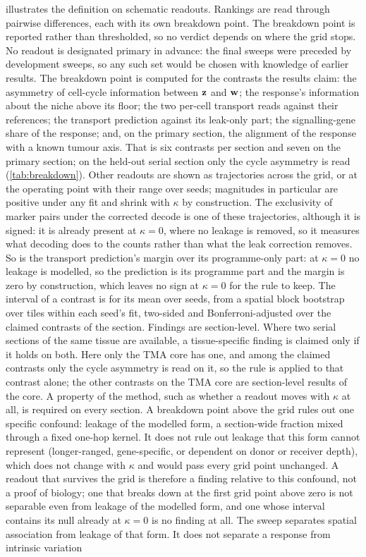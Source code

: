  \noindent {} illustrates the definition on schematic readouts. Rankings are read through pairwise differences, each with its own breakdown point. The breakdown point is reported rather than thresholded, so no verdict depends on where the grid stops. No readout is designated primary in advance: the final sweeps were preceded by development sweeps, so any such set would be chosen with knowledge of earlier results. The breakdown point is computed for the contrasts the results claim: the asymmetry of cell-cycle information between $\mathbf{z}$ and $\mathbf{w}$; the response's information about the niche above its floor; the two per-cell transport reads against their references; the transport prediction against its leak-only part; the signalling-gene share of the response; and, on the primary section, the alignment of the response with a known tumour axis. That is six contrasts per section and seven on the primary section; on the held-out serial section only the cycle asymmetry is read (\cref{tab:breakdown}). Other readouts are shown as trajectories across the grid, or at the operating point with their range over seeds; magnitudes in particular are positive under any fit and shrink with $\kappa$ by construction. The exclusivity of marker pairs under the corrected decode is one of these trajectories, although it is signed: it is already present at $\kappa = 0$, where no leakage is removed, so it measures what decoding does to the counts rather than what the leak correction removes. So is the transport prediction's margin over its programme-only part: at $\kappa = 0$ no leakage is modelled, so the prediction is its programme part and the margin is zero by construction, which leaves no sign at $\kappa = 0$ for the rule to keep. The interval of a contrast is for its mean over seeds, from a spatial block bootstrap over tiles within each seed's fit, two-sided and Bonferroni-adjusted over the claimed contrasts of the section. Findings are section-level. Where two serial sections of the same tissue are available, a tissue-specific finding is claimed only if it holds on both. Here only the TMA core has one, and among the claimed contrasts only the cycle asymmetry is read on it, so the rule is applied to that contrast alone; the other contrasts on the TMA core are section-level results of the core. A property of the method, such as whether a readout moves with $\kappa$ at all, is required on every section. A breakdown point above the grid rules out one specific confound: leakage of the modelled form, a section-wide fraction mixed through a fixed one-hop kernel. It does not rule out leakage that this form cannot represent (longer-ranged, gene-specific, or dependent on donor or receiver depth), which does not change with $\kappa$ and would pass every grid point unchanged. A readout that survives the grid is therefore a finding relative to this confound, not a proof of biology; one that breaks down at the first grid point above zero is not separable even from leakage of the modelled form, and one whose interval contains its null already at $\kappa = 0$ is no finding at all. The sweep separates spatial association from leakage of that form. It does not separate a response from intrinsic variation 